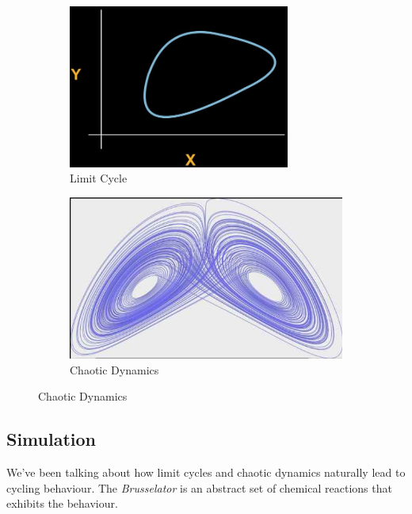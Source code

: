 \documentclass[]{article}
\begin{document}
{\begin{figure}[H]
	\caption{Processes that are easy to obtain through physical dynamics alone}
	\begin{subfigure}[t]{0.45\textwidth}
		\caption{Limit Cycle}\label{fig:LimitCycle}
		\includegraphics[width=0.8\textwidth]{LimitCycle}
	\end{subfigure}
	\begin{subfigure}[t]{0.45\textwidth}
		\caption{Chaotic Dynamics}\label{fig:ChaoticDynamics}
		\includegraphics[width=\textwidth]{ChaoticDynamics}
	\end{subfigure}
\end{figure}

\subsection{Simulation}

We've been talking about how limit cycles and chaotic dynamics naturally lead to cycling behaviour. The \textit{Brusselator} is an abstract set of chemical reactions that exhibits the behaviour.

}
\end{document}
